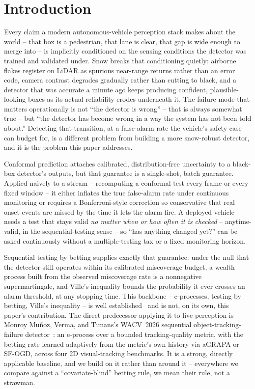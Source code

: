 \section{Introduction}
\label{sec:introduction}

Every claim a modern autonomous-vehicle perception stack makes about the world -- that box is a pedestrian, that lane is clear, that gap is wide enough to merge into -- is implicitly conditioned on the sensing conditions the detector was trained and validated under. Snow breaks that conditioning quietly: airborne flakes register on LiDAR as spurious near-range returns rather than an error code, camera contrast degrades gradually rather than cutting to black, and a detector that was accurate a minute ago keeps producing confident, plausible-looking boxes as its actual reliability erodes underneath it. The failure mode that matters operationally is not ``the detector is wrong'' -- that is always somewhat true -- but ``the detector has become wrong in a way the system has not been told about.'' Detecting that transition, at a false-alarm rate the vehicle's safety case can budget for, is a different problem from building a more snow-robust detector, and it is the problem this paper addresses.

Conformal prediction attaches calibrated, distribution-free uncertainty to a black-box detector's outputs, but that guarantee is a single-shot, batch guarantee. Applied naively to a stream -- recomputing a conformal test every frame or every fixed window -- it either inflates the true false-alarm rate under continuous monitoring or requires a Bonferroni-style correction so conservative that real onset events are missed by the time it lets the alarm fire. A deployed vehicle needs a test that stays valid \emph{no matter when or how often it is checked} -- anytime-valid, in the sequential-testing sense -- so ``has anything changed yet?'' can be asked continuously without a multiple-testing tax or a fixed monitoring horizon.

Sequential testing by betting supplies exactly that guarantee: under the null that the detector still operates within its calibrated miscoverage budget, a wealth process built from the observed miscoverage rate is a nonnegative supermartingale, and Ville's inequality bounds the probability it ever crosses an alarm threshold, at any stopping time. This backbone -- e-processes, testing by betting, Ville's inequality -- is well established~\cite{Ramdas2023GameTheoretic,WaudbySmithRamdas2024JRSSB} and is not, on its own, this paper's contribution. The direct predecessor applying it to live perception is Monroy Mu\~noz, Verma, and Timans's WACV~2026 sequential object-tracking-failure detector~\cite{MonroyMunoz2026WACV}: an e-process over a bounded tracking-quality metric, with the betting rate learned adaptively from the metric's own history via aGRAPA or SF-OGD, across four 2D visual-tracking benchmarks. It is a strong, directly applicable baseline, and we build on it rather than around it -- everywhere we compare against a ``covariate-blind'' betting rule, we mean their rule, not a strawman.

